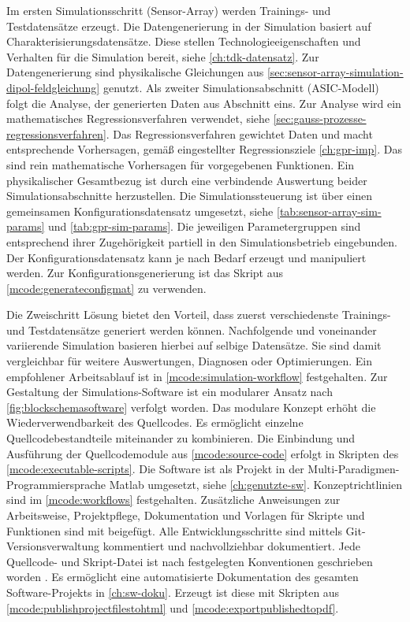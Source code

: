 Im ersten Simulationsschritt (Sensor-Array) werden Trainings- und Testdatensätze erzeugt. Die Datengenerierung in der Simulation basiert auf Charakterisierungsdatensätze. Diese stellen Technologieeigenschaften und Verhalten für die Simulation bereit, siehe \autoref{ch:tdk-datensatz}. Zur Datengenerierung sind physikalische Gleichungen aus \autoref{sec:sensor-array-simulation-dipol-feldgleichung} genutzt. Als zweiter Simulationsabschnitt (ASIC-Modell) folgt die Analyse, der generierten Daten aus Abschnitt eins. Zur Analyse wird ein mathematisches Regressionsverfahren verwendet, siehe \autoref{sec:gauss-prozesse-regressionsverfahren}. Das Regressionsverfahren gewichtet Daten und macht entsprechende Vorhersagen, gemäß eingestellter Regressionsziele \autoref{ch:gpr-imp}. Das sind rein mathematische Vorhersagen für vorgegebenen Funktionen. Ein physikalischer Gesamtbezug ist durch eine verbindende Auswertung beider Simulationsabschnitte herzustellen. Die Simulationssteuerung ist über einen gemeinsamen Konfigurationsdatensatz umgesetzt, siehe \autoref{tab:sensor-array-sim-params} und \autoref{tab:gpr-sim-params}. Die jeweiligen Parametergruppen sind entsprechend ihrer Zugehörigkeit partiell in den Simulationsbetrieb eingebunden. Der Konfigurationsdatensatz kann je nach Bedarf erzeugt und manipuliert werden. Zur Konfigurationsgenerierung ist das Skript aus \autoref{mcode:generateconfigmat} zu verwenden.


\clearpage


Die Zweischritt Lösung bietet den Vorteil, dass zuerst verschiedenste Trainings- und Testdatensätze generiert werden können. Nachfolgende und voneinander variierende Simulation basieren hierbei auf selbige Datensätze. Sie sind damit vergleichbar für weitere Auswertungen, Diagnosen oder Optimierungen. Ein empfohlener Arbeitsablauf ist in \autoref{mcode:simulation-workflow} festgehalten.
\newline
Zur Gestaltung der Simulations-Software ist ein modularer Ansatz nach \autoref{fig:blockschemasoftware} verfolgt worden. Das modulare Konzept erhöht die Wiederverwendbarkeit des Quellcodes. Es ermöglicht einzelne Quellcodebestandteile miteinander zu kombinieren. Die Einbindung und Ausführung der Quellcodemodule aus \autoref{mcode:source-code} erfolgt in Skripten des \autoref{mcode:executable-scripts}. Die Software ist als Projekt in der Multi-Paradigmen-Programmiersprache Matlab umgesetzt, siehe \autoref{ch:genutzte-sw}. Konzeptrichtlinien sind im \autoref{mcode:workflows} festgehalten. Zusätzliche Anweisungen zur Arbeitsweise, Projektpflege, Dokumentation und Vorlagen für Skripte und Funktionen sind mit beigefügt. Alle Entwicklungsschritte sind mittels Git-Versionsverwaltung kommentiert und nachvollziehbar dokumentiert. Jede Quellcode- und Skript-Datei ist nach festgelegten Konventionen geschrieben worden \cite{Johnson2014}. Es ermöglicht eine automatisierte Dokumentation des gesamten Software-Projekts in \autoref{ch:sw-doku}. Erzeugt ist diese mit Skripten aus \autoref{mcode:publishprojectfilestohtml} und \autoref{mcode:exportpublishedtopdf}.


